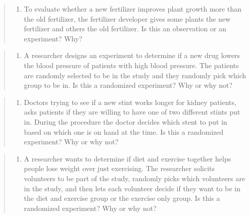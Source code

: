 \documentclass[]{book}
\providecommand{\tightlist}{%
  \setlength{\itemsep}{0pt}\setlength{\parskip}{0pt}}
\begin{document}
\begin{quote}
\begin{enumerate}
\def\labelenumi{\arabic{enumi}.}
\setcounter{enumi}{3}
\tightlist
\item
  To evaluate whether a new fertilizer improves plant growth more than the old fertilizer, the fertilizer developer gives some plants the new fertilizer and others the old fertilizer. Is this an observation or an experiment? Why?
\end{enumerate}
\end{quote}

\begin{quote}
\begin{enumerate}
\def\labelenumi{\arabic{enumi}.}
\setcounter{enumi}{4}
\tightlist
\item
  A researcher designs an experiment to determine if a new drug lowers the blood pressure of patients with high blood pressure. The patients are randomly selected to be in the study and they randomly pick which group to be in. Is this a randomized experiment? Why or why not?
\end{enumerate}
\end{quote}

\begin{quote}
\begin{enumerate}
\def\labelenumi{\arabic{enumi}.}
\setcounter{enumi}{5}
\tightlist
\item
  Doctors trying to see if a new stint works longer for kidney patients, asks patients if they are willing to have one of two different stints put in. During the procedure the doctor decides which stent to put in based on which one is on hand at the time. Is this a randomized experiment? Why or why not?
\end{enumerate}
\end{quote}

\begin{quote}
\begin{enumerate}
\def\labelenumi{\arabic{enumi}.}
\setcounter{enumi}{6}
\tightlist
\item
  A researcher wants to determine if diet and exercise together helps people lose weight over just exercising. The researcher solicits volunteers to be part of the study, randomly picks which volunteers are in the study, and then lets each volunteer decide if they want to be in the diet and exercise group or the exercise only group. Is this a randomized experiment? Why or why not?
\end{enumerate}
\end{quote}
\end{document}
